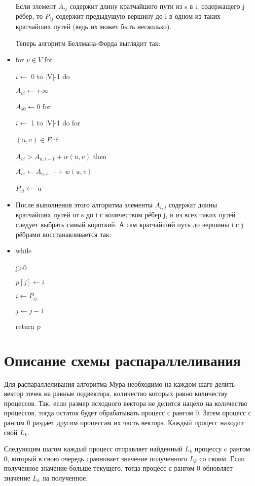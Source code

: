 \documentclass{report}
\begin{document}
\begin{itemize}
Если элемент $A_{ij}$ содержит длину кратчайшего пути из s в i, содержащего j рёбер, то $P_{ij}$ содержит предыдущую вершину до i в одном из таких кратчайших путей (ведь их может быть несколько).

Теперь алгоритм Беллмана-Форда выглядит так:
\item for 
$v\in V$
  for 

$i\gets$ 0 to 
|V|-1
    do 
  
$A_{{vi}}\gets +\infty $

  
$A_{{s0}}\gets 0$
for 

$i\gets$ 1 to 
|V|-1
  do for 

$(u,v)\in E$
    if 

$A_{{vi}}>A_{{u,i-1}}+w(u,v)$
      then 

$A_{{vi}}\gets A_{{u,i-1}}+w(u,v)$

$P_{{vi}}\gets$ u

\item После выполнения этого алгоритма элементы $A_{i,j}$ содержат длины кратчайших путей от s до i с количеством рёбер j, и из всех таких путей следует выбрать самый короткий. А сам кратчайший путь до вершины i с j рёбрами восстанавливается так:
\item while 
  
  
j>0
  
$p[j]\gets i$
  
  $i\gets P_{ij}$
  
  
$j\gets j-1$


return p
\end{itemize}
\newpage

\section*{Описание схемы распараллеливания}

\par Для распараллеливания алгоритма Мура необходимо на каждом шаге делить вектор точек на равные подвектора, количество которых равно количеству процессов. Так, если размер исходного вектора не делится нацело на количество процессов, тогда остаток будет обрабатывать процесс с рангом 0. Затем процесс с рангом 0 раздает другим процессам их часть вектора. Каждый процесс находит свой $L_{k}$.
\par Следующим шагом каждый процесс отправляет найденный $L_{k}$ процессу c рангом 0, который в свою очередь сравнивает значение полученного $L_{k}$ со своим. Если полученное значение больше текущего, тогда процесс с рангом 0 обновляет значение $L_{k}$ на полученное.
\newpage
\end{document}

